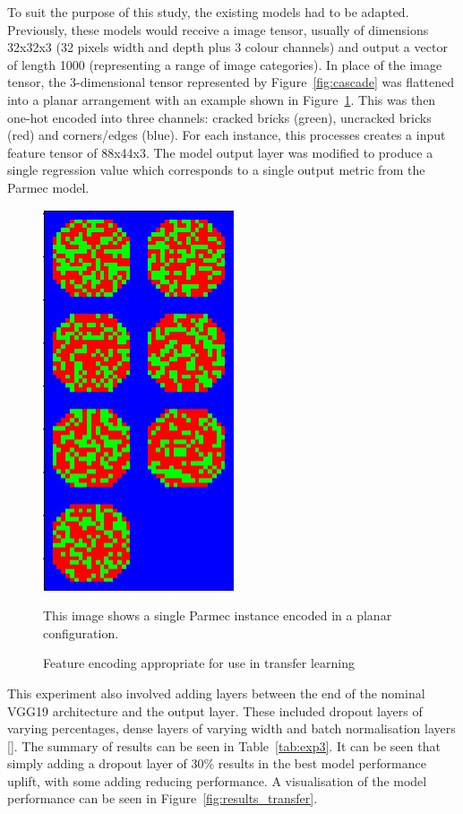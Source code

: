 \noindent
To suit the purpose of this study, the existing models had to be adapted. Previously, these models would receive a image tensor, usually of dimensions 32x32x3 (32 pixels width and depth plus 3 colour channels) and output a vector of length 1000 (representing a range of image categories). In place of the image tensor, the 3-dimensional tensor represented by Figure~\ref{fig:cascade} was flattened into a planar arrangement with an example shown in Figure~\ref{fig:transfer_encoding}. This was then one-hot encoded into three channels: cracked bricks (green), uncracked bricks (red) and corners/edges (blue). For each instance, this processes creates a input feature tensor of 88x44x3. The model output layer was modified to produce a single regression value which corresponds to a single output metric from the Parmec model.
\\

\begin{figure}[h]
	\centering
	\includegraphics[scale=0.75]{Figures/vgg_encoding.png}
	\caption{Feature encoding appropriate for use in transfer learning} {This image shows a single Parmec instance encoded in a planar configuration.}
	\label{fig:transfer_encoding}
\end{figure}

\noindent
This experiment also involved adding layers between the end of the nominal VGG19 architecture and the output layer. These included dropout layers of varying percentages, dense layers of varying width and batch normalisation layers [\cite{liao2016importance}]. The summary of results can be seen in Table~\ref{tab:exp3}. It can be seen that simply adding a dropout layer of 30\% results in the best model performance uplift, with some adding reducing performance. A visualisation of the model performance can be seen in Figure~\ref{fig:results_transfer}. 

